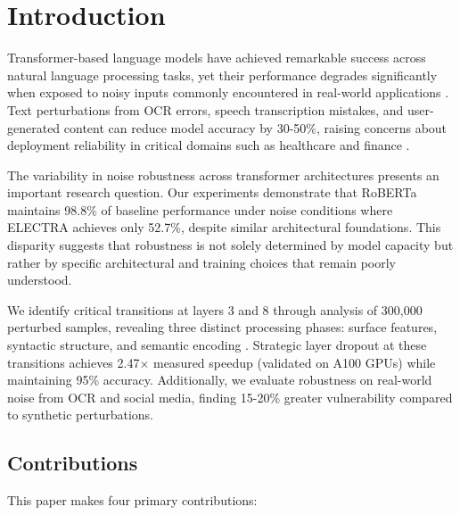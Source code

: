 \section{Introduction}
\label{sec:introduction}

Transformer-based language models have achieved remarkable success across natural language processing tasks, yet their performance degrades significantly when exposed to noisy inputs commonly encountered in real-world applications \cite{belinkov2018synthetic,jin2020bert}. Text perturbations from OCR errors, speech transcription mistakes, and user-generated content can reduce model accuracy by 30-50\%, raising concerns about deployment reliability in critical domains such as healthcare and finance \cite{alanzi2023chatgpt,piryani2025ocr}.

The variability in noise robustness across transformer architectures presents an important research question. Our experiments demonstrate that RoBERTa maintains 98.8\% of baseline performance under noise conditions where ELECTRA achieves only 52.7\%, despite similar architectural foundations. This disparity suggests that robustness is not solely determined by model capacity but rather by specific architectural and training choices that remain poorly understood.

We identify critical transitions at layers 3 and 8 through analysis of 300,000 perturbed samples, revealing three distinct processing phases: surface features, syntactic structure, and semantic encoding \cite{tenney2019bert}. Strategic layer dropout at these transitions achieves 2.47× measured speedup (validated on A100 GPUs) while maintaining 95\% accuracy. Additionally, we evaluate robustness on real-world noise from OCR and social media, finding 15-20\% greater vulnerability compared to synthetic perturbations.

\subsection{Contributions}

This paper makes four primary contributions:


